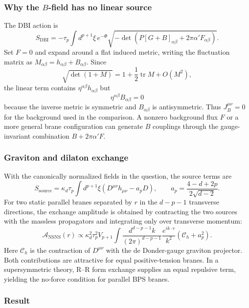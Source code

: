 \documentclass[
  10pt,
  a4paper,
  openany]{book}
\begin{document}
\subsubsection{\texorpdfstring{Why the \(B\)-field has no linear
source}{Why the B-field has no linear source}}\label{why-the-b-field-has-no-linear-source}

The DBI action is \[
S_{\mathrm{DBI}}=-\tau_p\int d^{p+1}\xi\,e^{-\Phi}
\sqrt{-\det\!\left(P[G+B]_{\alpha\beta}+2\pi\alpha'F_{\alpha\beta}\right)}.
\] Set \(F=0\) and expand around a flat induced metric, writing the
fluctuation matrix as
\(M_{\alpha\beta}=h_{\alpha\beta}+B_{\alpha\beta}\). Since \[
\sqrt{\det(1+M)}=1+\frac12\operatorname{tr}M+O(M^2),
\] the linear term contains \(\eta^{\alpha\beta}h_{\alpha\beta}\) but \[
\eta^{\alpha\beta}B_{\alpha\beta}=0
\] because the inverse metric is symmetric and \(B_{\alpha\beta}\) is
antisymmetric. Thus \(J_B^{\mu\nu}=0\) for the background used in the
comparison. A nonzero background flux \(F\) or a more general brane
configuration can generate \(B\) couplings through the gauge-invariant
combination \(B+2\pi\alpha'F\).

\subsubsection{Graviton and dilaton
exchange}\label{graviton-and-dilaton-exchange}

With the canonically normalized fields in the question, the source terms
are \[
S_{\mathrm{source}}
=\kappa_d\tau_p\int d^{p+1}\xi
\left(D^{\mu\nu}h_{\mu\nu}-a_pD\right),
\qquad
a_p=\frac{4-d+2p}{2\sqrt{d-2}}.
\] For two static parallel branes separated by \(r\) in the \(d-p-1\)
transverse directions, the exchange amplitude is obtained by contracting
the two sources with the massless propagators and integrating only over
transverse momentum: \[
\mathcal A_{\mathrm{NSNS}}(r)
\propto
\kappa_d^2\tau_p^2 V_{p+1}
\int\frac{d^{d-p-1}k}{(2\pi)^{d-p-1}}
\frac{e^{ik\cdot r}}{k^2}
\left(\mathcal C_h+a_p^2\right).
\] Here \(\mathcal C_h\) is the contraction of \(D^{\mu\nu}\) with the
de Donder-gauge graviton projector. Both contributions are attractive
for equal positive-tension branes. In a supersymmetric theory, R--R form
exchange supplies an equal repulsive term, yielding the no-force
condition for parallel BPS branes.

\subsubsection{Result}\label{result-2}
\end{document}
